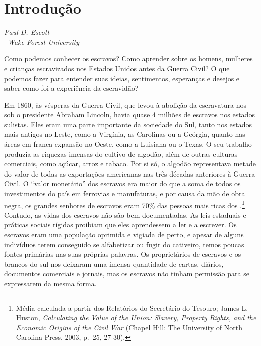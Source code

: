 \chapter*{Introdução}

\begin{flushright}
\emph{Paul D. Escott}\\\
\emph{Wake Forest University}
\end{flushright}

Como podemos conhecer os escravos? Como aprender sobre os homens,
mulheres e crianças escravizados nos Estados Unidos antes da Guerra
Civil? O que podemos fazer para entender suas ideias, sentimentos,
esperanças e desejos e saber como foi a experiência da escravidão?

Em 1860, às vésperas da Guerra Civil, que levou à abolição da
escravatura nos  sob o presidente Abraham Lincoln, havia quase 4
milhões de escravos nos estados sulistas. Eles eram uma parte importante
da sociedade do Sul, tanto nos estados mais antigos no Leste, como a
Virgínia, as Carolinas ou a Geórgia, quanto nas áreas em franca expansão
no Oeste, como a Luisiana ou o Texas. O seu trabalho produzia as
riquezas imensas do cultivo de algodão, além de outras culturas
comerciais, como açúcar, arroz e tabaco. Por si só, o algodão
representava metade do valor de todas as exportações americanas nas três
décadas anteriores à Guerra Civil. O ``valor monetário'' dos escravos
era maior do que a soma de todos os investimentos do país em ferrovias e
manufaturas, e por causa da mão de obra negra, os grandes senhores de
escravos eram 70\% das pessoas mais ricas dos \versal{EUA}.\footnote{Média
  calculada a partir dos Relatórios do Secretário do Tesouro; James L.
  Huston, \emph{Calculating the Value of the Union: Slavery, Property
  Rights, and the Economic Origins of the Civil War} (Chapel Hill: The
  University of North Carolina Press, 2003, p.~25, 27-30).} Contudo, as
vidas dos escravos não são bem documentadas. As leis estaduais e
práticas sociais rígidas proibiam que eles aprendessem a ler e a
escrever. Os escravos eram uma população oprimida e vigiada de perto, e
apesar de alguns indivíduos terem conseguido se alfabetizar ou fugir do
cativeiro, temos poucas fontes primárias nas suas próprias palavras. Os
proprietários de escravos e os brancos do sul nos deixaram uma imensa
quantidade de cartas, diários, documentos comerciais e jornais, mas os
escravos não tinham permissão para se expressarem da mesma forma.

